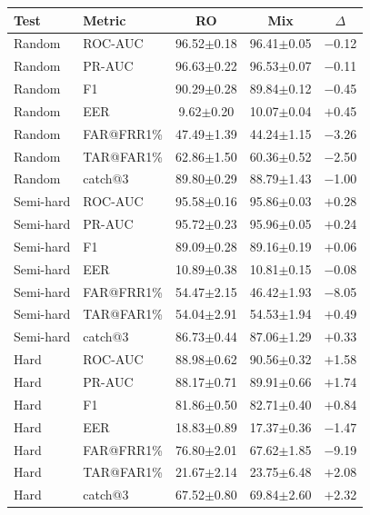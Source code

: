 \documentclass[11pt]{article}
\begin{document}
\begin{table}[!t]
\begin{minipage}[t]{0.48\textwidth}
\centering
\begin{tabular}{l l c c c}
\toprule
\textbf{Test} & \textbf{Metric} & \textbf{RO} & \textbf{Mix} & \textbf{$\Delta$} \\
\midrule
Random    & ROC-AUC    & 96.52$\pm$0.18 & 96.41$\pm$0.05 & $-$0.12 \\
Random    & PR-AUC     & 96.63$\pm$0.22 & 96.53$\pm$0.07 & $-$0.11 \\
Random    & F1         & 90.29$\pm$0.28 & 89.84$\pm$0.12 & $-$0.45 \\
Random    & EER        & \phantom{0}9.62$\pm$0.20 & 10.07$\pm$0.04 & $+$0.45 \\
Random    & FAR@FRR1\% & 47.49$\pm$1.39 & 44.24$\pm$1.15 & $-$3.26 \\
Random    & TAR@FAR1\% & 62.86$\pm$1.50 & 60.36$\pm$0.52 & $-$2.50 \\
Random    & catch@3    & 89.80$\pm$0.29 & 88.79$\pm$1.43 & $-$1.00 \\
\midrule
Semi-hard & ROC-AUC    & 95.58$\pm$0.16 & 95.86$\pm$0.03 & $+$0.28 \\
Semi-hard & PR-AUC     & 95.72$\pm$0.23 & 95.96$\pm$0.05 & $+$0.24 \\
Semi-hard & F1         & 89.09$\pm$0.28 & 89.16$\pm$0.19 & $+$0.06 \\
Semi-hard & EER        & 10.89$\pm$0.38 & 10.81$\pm$0.15 & $-$0.08 \\
Semi-hard & FAR@FRR1\% & 54.47$\pm$2.15 & 46.42$\pm$1.93 & $-$8.05 \\
Semi-hard & TAR@FAR1\% & 54.04$\pm$2.91 & 54.53$\pm$1.94 & $+$0.49 \\
Semi-hard & catch@3    & 86.73$\pm$0.44 & 87.06$\pm$1.29 & $+$0.33 \\
\midrule
Hard      & ROC-AUC    & 88.98$\pm$0.62 & 90.56$\pm$0.32 & $+$1.58 \\
Hard      & PR-AUC     & 88.17$\pm$0.71 & 89.91$\pm$0.66 & $+$1.74 \\
Hard      & F1         & 81.86$\pm$0.50 & 82.71$\pm$0.40 & $+$0.84 \\
Hard      & EER        & 18.83$\pm$0.89 & 17.37$\pm$0.36 & $-$1.47 \\
Hard      & FAR@FRR1\% & 76.80$\pm$2.01 & 67.62$\pm$1.85 & $-$9.19 \\
Hard      & TAR@FAR1\% & 21.67$\pm$2.14 & 23.75$\pm$6.48 & $+$2.08 \\
Hard      & catch@3    & 67.52$\pm$0.80 & 69.84$\pm$2.60 & $+$2.32 \\

\end{tabular}
\end{minipage}
\end{table}
\end{document}
